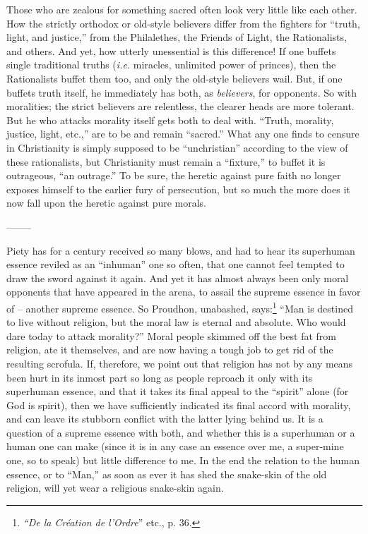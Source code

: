 \documentclass[12pt,a4paper]{book}
\begin{document}
Those who are zealous for something sacred often look very little like each 
other. How the strictly orthodox or old-style believers differ from the 
fighters for ``truth, light, and justice,'' from the Philalethes, the 
Friends of Light, the Rationalists, and others. And yet, how utterly 
unessential is this difference! If one buffets single traditional truths 
(\textit{i.e.} miracles, unlimited power of princes), then the Rationalists 
buffet them too, and only the old-style believers wail. But, if one buffets 
truth itself, he immediately has both, as \textit{believers}, for opponents. 
So with moralities; the strict believers are relentless, the clearer heads are 
more tolerant. But he who attacks morality itself gets both to deal with. 
``Truth, morality, justice, light, etc.,'' are to be and remain 
``sacred.'' What any one finds to censure in Christianity is simply supposed 
to be ``unchristian'' according to the view of these rationalists, but 
Christianity must remain a ``fixture,'' to buffet it is outrageous, ``an 
outrage.'' To be sure, the heretic against pure faith no longer exposes 
himself to the earlier fury of persecution, but so much the more does it now 
fall upon the heretic against pure morals.

\begin{center}
--------\end{center}


Piety has for a century received so many blows, and had to hear its superhuman 
essence reviled as an ``inhuman'' one so often, that one cannot feel tempted 
to draw the sword against it again. And yet it has almost always been only 
moral opponents that have appeared in the arena, to assail the supreme essence 
in favor of -- another supreme essence. So Proudhon, unabashed, 
says:\footnote{\textit{``De la Cr\'eation de l'Ordre}'' etc., p. 36.} ``Man 
is destined to live without religion, but the moral law is eternal and 
absolute. Who would dare today to attack morality?'' Moral people skimmed off 
the best fat from religion, ate it themselves, and are now having a tough job 
to get rid of the resulting scrofula. If, therefore, we point out that 
religion has not by any means been hurt in its inmost part so long as people 
reproach it only with its superhuman essence, and that it takes its final 
appeal to the ``spirit'' alone (for God is spirit), then we have 
sufficiently indicated its final accord with morality, and can leave its 
stubborn conflict with the latter lying behind us. It is a question of a 
supreme essence with both, and whether this is a superhuman or a human one can 
make (since it is in any case an essence over me, a super-mine one, so to 
speak) but little difference to me. In the end the relation to the human 
essence, or to ``Man,'' as soon as ever it has shed the snake-skin of the 
old religion, will yet wear a religious snake-skin again.
\end{document}
